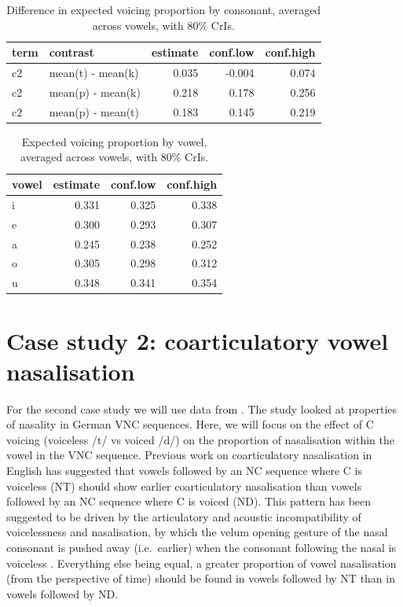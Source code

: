 \documentclass[
  authoryear,
  preprint,
  3p]{elsarticle}
\begin{document}
\begin{longtable}[]{@{}llrrr@{}}

\caption{\label{tbl-marginal-1}Difference in expected voicing proportion
by consonant, averaged across vowels, with 80\% CrIs.}

\tabularnewline

\toprule\noalign{}
term & contrast & estimate & conf.low & conf.high \\
\midrule\noalign{}
\endhead
\bottomrule\noalign{}
\endlastfoot
c2 & mean(t) - mean(k) & 0.035 & -0.004 & 0.074 \\
c2 & mean(p) - mean(k) & 0.218 & 0.178 & 0.256 \\
c2 & mean(p) - mean(t) & 0.183 & 0.145 & 0.219 \\

\end{longtable}

\begin{longtable}[]{@{}lrrr@{}}

\caption{\label{tbl-marginal-2}Expected voicing proportion by vowel,
averaged across vowels, with 80\% CrIs.}

\tabularnewline

\toprule\noalign{}
vowel & estimate & conf.low & conf.high \\
\midrule\noalign{}
\endhead
\bottomrule\noalign{}
\endlastfoot
i & 0.331 & 0.325 & 0.338 \\
e & 0.300 & 0.293 & 0.307 \\
a & 0.245 & 0.238 & 0.252 \\
o & 0.305 & 0.298 & 0.312 \\
u & 0.348 & 0.341 & 0.354 \\

\end{longtable}

\section{Case study 2: coarticulatory vowel
nasalisation}\label{sec-case-2}

For the second case study we will use data from \citet{carignan2021}.
The study looked at properties of nasality in German VNC sequences.
Here, we will focus on the effect of C voicing (voiceless /t/ vs voiced
/d/) on the proportion of nasalisation within the vowel in the VNC
sequence. Previous work on coarticulatory nasalisation in English has
suggested that vowels followed by an NC sequence where C is voiceless
(NT) should show earlier coarticulatory nasalisation than vowels
followed by an NC sequence where C is voiced (ND). This pattern has been
suggested to be driven by the articulatory and acoustic incompatibility
of voicelessness and nasalisation, by which the velum opening gesture of
the nasal consonant is pushed away (i.e.~earlier) when the consonant
following the nasal is voiceless
\citep{fowler2005, beddor2009, cho2017, carignan2015}. Everything else
being equal, a greater proportion of vowel nasalisation (from the
perspective of time) should be found in vowels followed by NT than in
vowels followed by ND.
\end{document}
